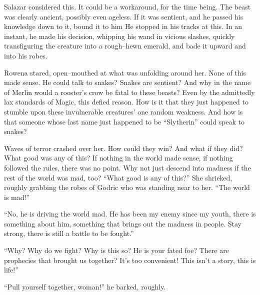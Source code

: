 

\SmallVSpace
Salazar considered this. It could be a workaround, for the time being. The beast was clearly ancient, possibly even ageless. If it was sentient, and he passed his knowledge down to it, bound it to him{\el}
\SmallVSpace
{}
\SmallVSpace
He stopped in his tracks at this. In an instant, he made his decision, whipping his wand in vicious slashes, quickly transfiguring the creature into a rough\mbox{--}hewn emerald, and bade it upward and into his robes.

Rowena stared, open\mbox{--}mouthed at what was unfolding around her. None of this made sense. He could talk to snakes? Snakes are sentient? And why in the name of Merlin would a rooster’s crow be fatal to these beasts? Even by the admittedly lax standards of Magic, this defied reason. How is it that they just happened to stumble upon these invulnerable creatures’ one random weakness. And how is that someone whose last name just happened to be “Slytherin” could speak to snakes?

Waves of terror crashed over her. How could they win? And what if they did? What good was any of this? If nothing in the world made sense, if nothing followed the rules, there was no point. Why not just descend into madness if the rest of the world was mad, too?
\SomeVSpace
“What good is any of this?” She shrieked, roughly grabbing the robes of Godric who was standing near to her. “The world is mad!”

“No, he is driving the world mad. He has been my enemy since my youth, there is something about him, something that brings out the madness in people. Stay strong, there is still a battle to be fought.”

“Why? Why do we fight? Why is this so? He is your fated foe? There are prophecies that brought us together? It’s too convenient! This isn’t a story, this is life!”

“Pull yourself together, woman!” he barked, roughly.

